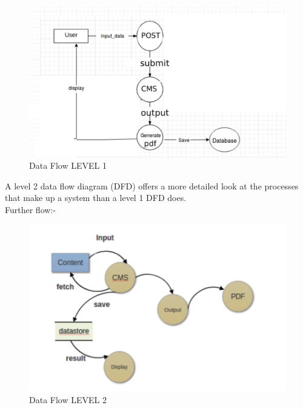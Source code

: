 \begin{figure}[h!]
\centering \includegraphics[scale=0.5]{input/images/cms2.pdf}
\caption{Data Flow LEVEL 1}
\label{fig:DFDs}
\end{figure}
\newpage
A level 2 data flow diagram (DFD) offers a more detailed look at the processes that make up a system than a level 1 DFD does.\\
Further flow:-

\begin{figure}[h!]
\centering \includegraphics[scale=0.7]{input/images/cms3.pdf}
\caption{Data Flow LEVEL 2}
\label{fig:DFDs}
\end{figure}

